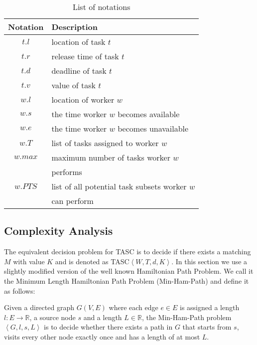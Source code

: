 \begin{table}
\begin{center}
\begin{tabular}{| c | l |} \hline
Notation	&	Description \\ \hline
$t.l$			&	location of task $t$ \\ \hline
$t.r$			&	release time of task $t$ \\ \hline
$t.d$		& 	deadline of task $t$ \\ \hline
$t.v$		&	value of task $t$ \\ \hline
$w.l$		&	location of worker $w$ \\ \hline
$w.s$		&	the time worker $w$ becomes available \\ \hline
$w.e$		&	the time worker $w$ becomes unavailable \\ \hline
$w.T$		&	list of tasks assigned to worker $w$ \\ \hline
$w.max$	&	maximum number of tasks worker $w$ \\
				&	performs \\ \hline
$w.PTS$	&	list of all potential task subsets worker $w$ \\
				&	can perform \\ \hline
\end{tabular}
\caption{List of notations}
\label{tab:notation}
\end{center}
\end{table}

\subsection{Complexity Analysis}

The equivalent decision problem for TASC is to decide if there exists a matching $M$ with value $K$ and is denoted as TASC$\left\langle W, T, d, K \right\rangle$. In this section we use a slightly modified version of the well known Hamiltonian Path Problem. We call it the Minimum Length Hamiltonian Path Problem (Min-Ham-Path) and define it as follows:

\begin{definition}
Given a directed graph $G(V,E)$ where each edge $e \in E$ is assigned a length $l: E \rightarrow \mathbb{R}$, a source node $s$ and a length $L \in \mathbb{R}$, the Min-Ham-Path problem $\left\langle G, l, s, L \right\rangle$ is to decide whether there exists a path in $G$ that starts from $s$, visits every other node exactly once and has a length of at most $L$.
\end{definition}

